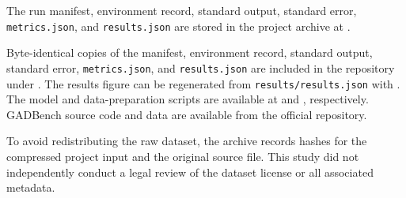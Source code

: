 \documentclass[11pt,a4paper]{article}
\begin{document}
The run manifest, environment record, standard output, standard error, \texttt{metrics.json}, and \texttt{results.json} are stored in the project archive at .

Byte-identical copies of the manifest, environment record, standard output, standard error, \texttt{metrics.json}, and \texttt{results.json} are included in the repository under . The results figure can be regenerated from \texttt{results/results.json} with . The model and data-preparation scripts are available at  and , respectively. GADBench source code and data are available from the official repository\cite{gadbenchrepo}.

To avoid redistributing the raw dataset, the archive records hashes for the compressed project input and the original source file. This study did not independently conduct a legal review of the dataset license or all associated metadata.
\end{document}
